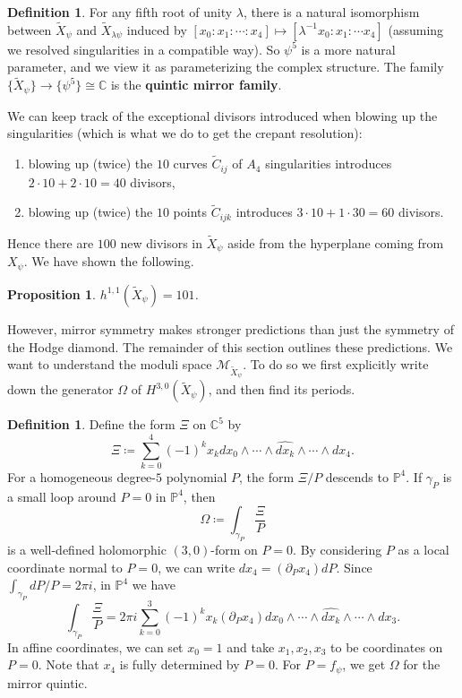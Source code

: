 \documentclass{report}
\theoremstyle{plain}
\newtheorem{proposition}[theorem]{Proposition}
\theoremstyle{definition}
\newtheorem{definition}[theorem]{Definition}
\theoremstyle{remark}
\newcommand{\di}{\partial}
\newcommand{\bC}{\mathbb{C}}
\newcommand{\bP}{\mathbb{P}}
\newcommand{\cM}{\mathcal{M}}
\begin{document}
\begin{definition} \label{def:mirror-quintic}
  For any fifth root of unity $\lambda$, there is a natural
  isomorphism between $\tilde{X}_{\psi}$ and $\tilde{X}_{\lambda\psi}$
  induced by $[x_0 : x_1 : \cdots : x_4] \mapsto [\lambda^{-1}x_0 :
    x_1 : \cdots x_4]$ (assuming we resolved singularities in a
  compatible way). So $\psi^5$ is a more natural parameter, and we
  view it as parameterizing the complex structure. The family
  $\{\tilde{X}_{\psi}\} \to \{\psi^5\} \cong \bC$ is the {\bf quintic
    mirror family}.
\end{definition}

We can keep track of the exceptional divisors introduced when blowing
up the singularities (which is what we do to get the crepant
resolution):
\begin{enumerate}
\item blowing up (twice) the $10$ curves $\tilde{C}_{ij}$ of $A_4$
  singularities introduces $2 \cdot 10 + 2 \cdot 10 = 40$ divisors,
\item blowing up (twice) the $10$ points $\tilde{C}_{ijk}$ introduces
  $3 \cdot 10 + 1 \cdot 30 = 60$ divisors.
\end{enumerate}
Hence there are $100$ new divisors in $\tilde{X}_\psi$ aside from the
hyperplane coming from $X_\psi$. We have shown the following.

\begin{proposition}
  $h^{1,1}(\tilde{X}_\psi) = 101$.
\end{proposition}

However, mirror symmetry makes stronger predictions than just the
symmetry of the Hodge diamond. The remainder of this section outlines
these predictions. We want to understand the moduli space
$\cM_{\tilde{X}_{\psi}}$. To do so we first explicitly write down the
generator $\Omega$ of $H^{3,0}(\tilde{X}_\psi)$, and then find its
periods.

\begin{definition}
  Define the form $\Xi$ on $\bC^5$ by
  \[ \Xi \coloneqq \sum_{k=0}^4 (-1)^k x_k dx_0 \wedge \cdots \wedge \widehat{dx_k} \wedge \cdots \wedge dx_4. \]
  For a homogeneous degree-$5$ polynomial $P$, the form $\Xi/P$
  descends to $\bP^4$. If $\gamma_P$ is a small loop around $P=0$ in
  $\bP^4$, then
  \[ \Omega \coloneqq \int_{\gamma_P} \frac{\Xi}{P} \]
  is a well-defined holomorphic $(3,0)$-form on $P=0$. By considering
  $P$ as a local coordinate normal to $P=0$, we can write $dx_4 =
  (\di_P x_4) dP$. Since $\int_{\gamma_P} dP/P = 2\pi i$, in $\bP^4$
  we have
  \[ \int_{\gamma_P} \frac{\Xi}{P} = 2\pi i\sum_{k=0}^3 (-1)^k x_k (\di_P x_4) dx_0 \wedge \cdots \wedge \widehat{dx_k} \wedge \cdots \wedge dx_3. \]
  In affine coordinates, we can set $x_0 = 1$ and take $x_1, x_2, x_3$
  to be coordinates on $P = 0$. Note that $x_4$ is fully determined by
  $P=0$. For $P = f_\psi$, we get $\Omega$ for the mirror quintic.
\end{definition}
\end{document}
